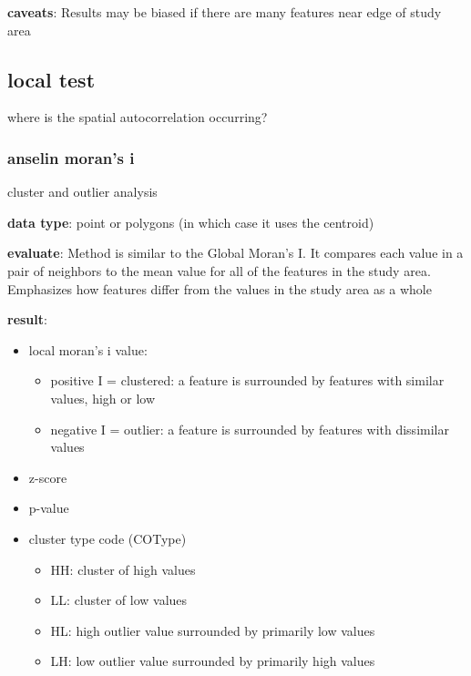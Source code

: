 \documentclass[
]{article}
\begin{document}
\textbf{caveats}: Results may be biased if there are many features near
edge of study area

\hypertarget{local-test}{%
\subsection{local test}\label{local-test}}

where is the spatial autocorrelation occurring?

\hypertarget{anselin-morans-i}{%
\subsubsection{anselin moran's i}\label{anselin-morans-i}}

cluster and outlier analysis

\textbf{data type}: point or polygons (in which case it uses the
centroid)

\textbf{evaluate}: Method is similar to the Global Moran's I. It
compares each value in a pair of neighbors to the mean value for all of
the features in the study area. Emphasizes how features differ from the
values in the study area as a whole

\textbf{result}:

\begin{itemize}
\item
  local moran's i value:

  \begin{itemize}
  \item
    positive I = clustered: a feature is surrounded by features with
    similar values, high or low
  \item
    negative I = outlier: a feature is surrounded by features with
    dissimilar values
  \end{itemize}
\item
  z-score
\item
  p-value
\item
  cluster type code (COType)

  \begin{itemize}
  \item
    HH: cluster of high values
  \item
    LL: cluster of low values
  \item
    HL: high outlier value surrounded by primarily low values
  \item
    LH: low outlier value surrounded by primarily high values
  \end{itemize}
\end{itemize}
\end{document}
